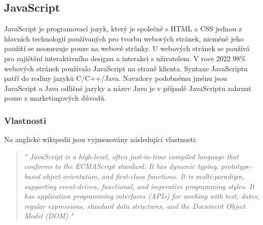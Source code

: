 \documentclass[main.tex]{subfiles}
\begin{document}
\subsection{JavaScript}
\label{javascript}
JavaScript je programovací jazyk, který je společně s HTML a CSS jednou z hlavních technologií používaných pro tvorbu webových stránek, nicméně jeho použití se neomezuje pouze na webové stránky. U webových stránek se používá pro zajištění interaktivního designu a interakci s uživatelem. V roce 2022 98\% webových stránek používalo JavaScript na straně klienta. Syntaxe JavaScriptu patří do rodiny jazyků C/C++/Java. Navzdory podobnému jménu jsou JavaScript a Java odlišné jazyky a název Java je v případě JavaScriptu zahrnut pouze z marketingových důvodů.


\subsubsection{Vlastnosti}
Na anglické wikipedii jsou vyjmenovány následující vlastnosti:
\begin{quote} \textit{" JavaScript is a high-level, often just-in-time compiled language that conforms to the ECMAScript standard. It has dynamic typing, prototype-based object-orientation, and first-class functions. It is multi-paradigm, supporting event-driven, functional, and imperative programming styles. It has application programming interfaces (APIs) for working with text, dates, regular expressions, standard data structures, and the Document Object Model (DOM)." \cite{web:wik:en:js}} \end{quote} 
\end{document}
